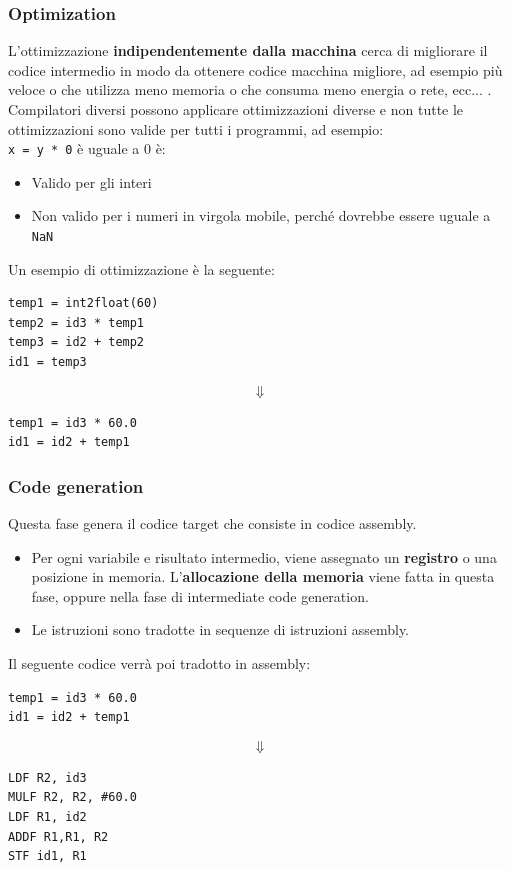 \documentclass[a4paper]{article}
\begin{document}
\subsubsection{Optimization}
L'ottimizzazione \textbf{indipendentemente dalla macchina} cerca di migliorare il
codice intermedio in modo da ottenere codice macchina migliore, ad esempio
più veloce o che utilizza meno memoria o che consuma meno energia o rete, ecc... .
Compilatori diversi possono applicare ottimizzazioni diverse e non tutte le ottimizzazioni
sono valide per tutti i programmi, ad esempio:\\
\texttt{x = y * 0} è uguale a 0 è:
\begin{itemize}
  \item Valido per gli interi
  \item Non valido per i numeri in virgola mobile, perché dovrebbe essere uguale a 
    \texttt{NaN}
\end{itemize}

\begin{example}
  Un esempio di ottimizzazione è la seguente:
\begin{lstlisting}
temp1 = int2float(60)
temp2 = id3 * temp1
temp3 = id2 + temp2
id1 = temp3
\end{lstlisting}
  \[
    \Downarrow
  \] 
\begin{lstlisting}
temp1 = id3 * 60.0
id1 = id2 + temp1
\end{lstlisting}
\end{example}

\subsubsection{Code generation}
Questa fase genera il codice target che consiste in codice assembly.
\begin{itemize}
  \item Per ogni variabile e risultato intermedio, viene assegnato un \textbf{registro} o
    una posizione in memoria. L'\textbf{allocazione della memoria} viene fatta in questa
    fase, oppure nella fase di intermediate code generation.

  \item Le istruzioni sono tradotte in sequenze di istruzioni assembly.
\end{itemize}

\begin{example}
  Il seguente codice verrà poi tradotto in assembly:
\begin{lstlisting}
temp1 = id3 * 60.0
id1 = id2 + temp1
\end{lstlisting}
\[
  \Downarrow
\] 
\begin{lstlisting}
LDF R2, id3
MULF R2, R2, #60.0
LDF R1, id2
ADDF R1,R1, R2
STF id1, R1
\end{lstlisting}

\end{example}
\end{document}
